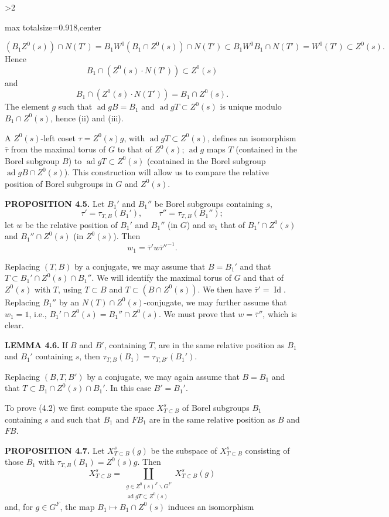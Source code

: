 \documentclass[9pt,twoside]{extarticle}
\newcommand{\EditionPage}[3]{%
  \ifnum#1>2\clearpage\fi
  \pdfbookmark[1]{Printed page #2}{en-folio-#2}%
  \hypertarget{en-physical-#1}{}%
  \noindent\begin{adjustbox}{max totalsize={\textwidth}{0.918\textheight},center}
  \begin{minipage}[t]{\textwidth}
  \fontsize{9.4}{11.1}\selectfont\justifying
  #3
  \end{minipage}
  \end{adjustbox}%
}
\begin{document}
\EditionPage{24}{125}{%
\[
(B_1Z^0(s))\cap N(T')
=
B_1W^0(B_1\cap Z^0(s))\cap N(T')
\subset
B_1W^0B_1\cap N(T')
=
W^0(T')
\subset Z^0(s).
\] Hence \[
B_1\cap(Z^0(s)\cdot N(T'))\subset Z^0(s)
\] and \[
B_1\cap(Z^0(s)\cdot N(T'))=B_1\cap Z^0(s).
\] The element \(g\) such that \(\operatorname{ad}gB=B_1\) and \(\operatorname{ad}gT\subset Z^0(s)\) is unique modulo \(B_1\cap Z^0(s)\), hence (ii) and (iii).\par

A \(Z^0(s)\)-left coset \(\tau=Z^0(s)g\), with \(\operatorname{ad}gT\subset Z^0(s)\), defines an isomorphism \(\overline\tau\) from the maximal torus of \(G\) to that of \(Z^0(s)\); \(\operatorname{ad}g\) maps \(T\) (contained in the Borel subgroup \(B\)) to \(\operatorname{ad}gT\subset Z^0(s)\) (contained in the Borel subgroup \(\operatorname{ad}gB\cap Z^0(s)\)). This construction will allow us to compare the relative position of Borel subgroups in \(G\) and \(Z^0(s)\).\par

\noindent\textbf{PROPOSITION 4.5.} Let \(B_1'\) and \(B_1''\) be Borel subgroups containing \(s\), \[
\tau'=\tau_{T,B}(B_1'),\qquad \tau''=\tau_{T,B}(B_1'');
\] let \(w\) be the relative position of \(B_1'\) and \(B_1''\) (in \(G\)) and \(w_1\) that of \(B_1'\cap Z^0(s)\) and \(B_1''\cap Z^0(s)\) (in \(Z^0(s)\)). Then \[
w_1=\overline\tau' w\overline\tau''^{-1}.
\]\par

Replacing \((T,B)\) by a conjugate, we may assume that \(B=B_1'\) and that \(T\subset B_1'\cap Z^0(s)\cap B_1''\). We will identify the maximal torus of \(G\) and that of \(Z^0(s)\) with \(T\), using \(T\subset B\) and \(T\subset(B\cap Z^0(s))\). We then have \(\overline\tau'=\operatorname{Id}\). Replacing \(B_1''\) by an \(N(T)\cap Z^0(s)\)-conjugate, we may further assume that \(w_1=1\), i.e., \(B_1'\cap Z^0(s)=B_1''\cap Z^0(s)\). We must prove that \(w=\overline\tau''\), which is clear.\par

\noindent\textbf{LEMMA 4.6.} If \(B\) and \(B'\), containing \(T\), are in the same relative position as \(B_1\) and \(B_1'\) containing \(s\), then \(\tau_{T,B}(B_1)=\tau_{T,B'}(B_1')\).\par

Replacing \((B,T,B')\) by a conjugate, we may again assume that \(B=B_1\) and that \(T\subset B_1\cap Z^0(s)\cap B_1'\). In this case \(B'=B_1'\).\par

To prove (4.2) we first compute the space \(X_{T\subset B}^s\) of Borel subgroups \(B_1\) containing \(s\) and such that \(B_1\) and \(FB_1\) are in the same relative position as \(B\) and \(FB\).\par

\noindent\textbf{PROPOSITION 4.7.} Let \(X_{T\subset B}^s(g)\) be the subspace of \(X_{T\subset B}^s\) consisting of those \(B_1\) with \(\tau_{T,B}(B_1)=Z^0(s)g\). Then \[
\tag{4.7.1}
X_{T\subset B}^s
=
\coprod_{\substack{g\in Z^0(s)^F\backslash G^F\\\operatorname{ad}gT\subset Z^0(s)}}
X_{T\subset B}^s(g)
\] and, for \(g\in G^F\), the map \(B_1\mapsto B_1\cap Z^0(s)\) induces an isomorphism\par
}
\end{document}
